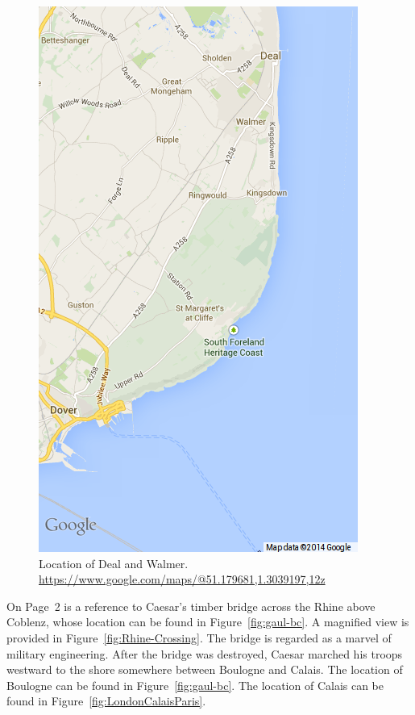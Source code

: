 \documentclass[twocolumn]{book}
\begin{document}
\begin{figure}
   \begin{center}
      \includegraphics[width=0.9\columnwidth]{images/DoverDealWalmer}
      \caption{%
         Location of Deal and Walmer\@.
         \url{https://www.google.com/maps/@51.179681,1.3039197,12z}
      }\label{fig:DoverDealWalmer}
   \end{center}
\end{figure}

On Page~2 is a reference to Caesar's timber bridge across the Rhine above
Coblenz, whose location can be found in Figure~\ref{fig:gaul-bc}. A magnified
view is provided in Figure~\ref{fig:Rhine-Crossing}. The bridge is regarded as
a marvel of military engineering. After the bridge was destroyed, Caesar
marched his troops westward to the shore somewhere between Boulogne and Calais.
The location of Boulogne can be found in Figure~\ref{fig:gaul-bc}. The location of
Calais can be found in Figure~\ref{fig:LondonCalaisParis}.
\end{document}
